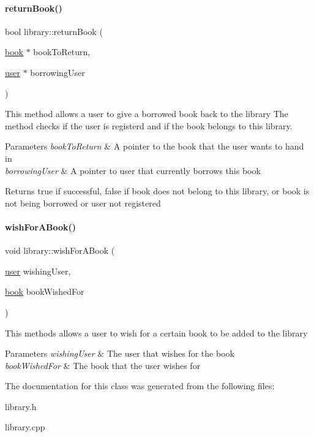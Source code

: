 \paragraph{\texorpdfstring{return\+Book()}{returnBook()}}
{\footnotesize\ttfamily bool library\+::return\+Book (\begin{DoxyParamCaption}\item[{\hyperlink{classbook}{book} $\ast$}]{book\+To\+Return,  }\item[{\hyperlink{classuser}{user} $\ast$}]{borrowing\+User }\end{DoxyParamCaption})}

This method allows a user to give a borrowed book back to the library The method checks if the user is registerd and if the book belongs to this library.


\begin{DoxyParams}{Parameters}
{\em book\+To\+Return} & A pointer to the book that the user wants to hand in \\
\hline
{\em borrowing\+User} & A pointer to user that currently borrows this book \\
\hline
\end{DoxyParams}
\begin{DoxyReturn}{Returns}
true if successful, false if book does not belong to this library, or book is not being borrowed or user not registered 
\end{DoxyReturn}
\mbox{\label{classlibrary_a820b95e5a2738e923c6609ea68517286}} 
\paragraph{\texorpdfstring{wish\+For\+A\+Book()}{wishForABook()}}
{\footnotesize\ttfamily void library\+::wish\+For\+A\+Book (\begin{DoxyParamCaption}\item[{\hyperlink{classuser}{user}}]{wishing\+User,  }\item[{\hyperlink{classbook}{book}}]{book\+Wished\+For }\end{DoxyParamCaption})}

This methods allows a user to wish for a certain book to be added to the library


\begin{DoxyParams}{Parameters}
{\em wishing\+User} & The user that wishes for the book \\
\hline
{\em book\+Wished\+For} & The book that the user wishes for \\
\hline
\end{DoxyParams}


The documentation for this class was generated from the following files\+:\begin{DoxyCompactItemize}
\item 
library.\+h\item 
library.\+cpp\end{DoxyCompactItemize}
